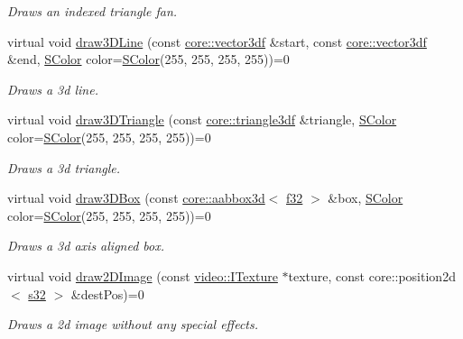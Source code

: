 \begin{DoxyCompactItemize}
\begin{DoxyCompactList}\small\item\em Draws an indexed triangle fan. \end{DoxyCompactList}\item 
virtual void \hyperlink{classirr_1_1video_1_1IVideoDriver_a5e4e03dca1720f3d2019b73a4eebb5e6}{draw3\+D\+Line} (const \hyperlink{namespaceirr_1_1core_a06f169d08b5c429f5575acb7edbad811}{core\+::vector3df} \&start, const \hyperlink{namespaceirr_1_1core_a06f169d08b5c429f5575acb7edbad811}{core\+::vector3df} \&end, \hyperlink{classirr_1_1video_1_1SColor}{S\+Color} color=\hyperlink{classirr_1_1video_1_1SColor}{S\+Color}(255, 255, 255, 255))=0
\begin{DoxyCompactList}\small\item\em Draws a 3d line. \end{DoxyCompactList}\item 
virtual void \hyperlink{classirr_1_1video_1_1IVideoDriver_ac5eb03a333a43d17278dad31be19efca}{draw3\+D\+Triangle} (const \hyperlink{namespaceirr_1_1core_a1112835405bbec5dadf031dc7934e7d0}{core\+::triangle3df} \&triangle, \hyperlink{classirr_1_1video_1_1SColor}{S\+Color} color=\hyperlink{classirr_1_1video_1_1SColor}{S\+Color}(255, 255, 255, 255))=0
\begin{DoxyCompactList}\small\item\em Draws a 3d triangle. \end{DoxyCompactList}\item 
virtual void \hyperlink{classirr_1_1video_1_1IVideoDriver_a7773fce9358ee81db5484b2d21015570}{draw3\+D\+Box} (const \hyperlink{classirr_1_1core_1_1aabbox3d}{core\+::aabbox3d}$<$ \hyperlink{namespaceirr_a0277be98d67dc26ff93b1a6a1d086b07}{f32} $>$ \&box, \hyperlink{classirr_1_1video_1_1SColor}{S\+Color} color=\hyperlink{classirr_1_1video_1_1SColor}{S\+Color}(255, 255, 255, 255))=0
\begin{DoxyCompactList}\small\item\em Draws a 3d axis aligned box. \end{DoxyCompactList}\item 
virtual void \hyperlink{classirr_1_1video_1_1IVideoDriver_ac1f12aefefb24414e03876bca942fb02}{draw2\+D\+Image} (const \hyperlink{classirr_1_1video_1_1ITexture}{video\+::\+I\+Texture} $\ast$texture, const core\+::position2d$<$ \hyperlink{namespaceirr_ac66849b7a6ed16e30ebede579f9b47c6}{s32} $>$ \&dest\+Pos)=0
\begin{DoxyCompactList}\small\item\em Draws a 2d image without any special effects. \end{DoxyCompactList}\item 

\end{DoxyCompactItemize}
